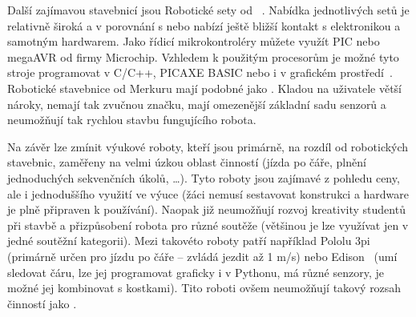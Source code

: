 Další zajímavou stavebnicí jsou Robotické sety od ~\cite{merkur_roboticsSetsEshop}. 
Nabídka jednotlivých setů je relativně široká a v porovnání s \legoM{ }nebo \fischerT{ }nabízí ještě bližší kontakt s elektronikou a samotným hardwarem. 
Jako řídicí mikrokontroléry můžete využít PIC nebo megaAVR od firmy Microchip. 
% 
% 
%
%
Vzhledem k použitým procesorům je možné tyto stroje programovat v C/C++, PICAXE BASIC nebo i v grafickém prostředí~\cite{picaxeCz_BlocklyForPICAXE}. 
Robotické stavebnice od Merkuru mají podobné  jako \fischerT. 
Kladou na uživatele větší nároky, nemají tak zvučnou značku, mají omezenější základní sadu senzorů a neumožňují tak rychlou stavbu fungujícího robota.

Na závěr lze zmínit výukové roboty, kteří jsou primárně, na rozdíl od robotických stavebnic, zaměřeny na velmi úzkou oblast činností (jízda po čáře, plnění jednoduchých sekvenčních úkolů, \dots). 
Tyto roboty jsou zajímavé z pohledu ceny, ale i jednoduššího využití ve výuce (žáci nemusí sestavovat konstrukci a hardware je plně připraven k používání). 
% 
% 
% 
%
%
Naopak již neumožňují rozvoj kreativity studentů při stavbě a přizpůsobení robota pro různé soutěže (většinou je lze využívat jen v jedné soutěžní kategorii).  
Mezi takovéto roboty patří například Pololu 3pi~\cite{robotPololu3pi} (primárně určen pro jízdu po čáře -- zvládá jezdit až 1 m/s) nebo Edison~\cite{robotEdison} (umí sledovat čáru, lze jej programovat graficky i v Pythonu, má různé senzory, je možné jej kombinovat s \lego{ }kostkami). 
% 
% 
%
%
Tito roboti ovšem neumožňují takový rozsah činností jako \legoM.

